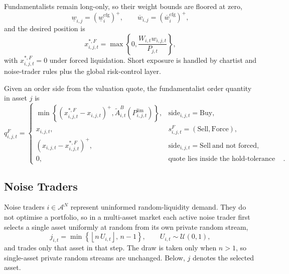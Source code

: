 \documentclass[12pt, a4paper]{article}
\newcommand{\pospart}[1]{\left(#1\right)^{+}}
\begin{document}
    Fundamentalists remain long-only, so their weight bounds are floored at zero,
    \[
        \underline w_{i,j}=\pospart{\underline w_i^{\text{cfg}}},
        \qquad
        \overline w_{i,j}=\pospart{\overline w_i^{\text{cfg}}},
    \]
    and the desired position is
    \[
        x_{i,j,t}^{\ast,F}=\max\left\{0,\frac{W_{i,t}w_{i,j,t}}{P_{j,t}}\right\},
    \]
    with \(x_{i,j,t}^{\ast,F}=0\) under forced liquidation. Short exposure is
    handled by chartist and noise-trader rules plus the global risk-control layer.

    Given an order side from the valuation quote, the fundamentalist order quantity
    in asset \(j\) is
    \[
        q_{i,j,t}^{F}=
        \begin{cases}
            \min\left\{\pospart{x_{i,j,t}^{\ast,F}-x_{i,j,t}},\tilde A_{i,t}^{B}(P_{i,j,t}^{\text{lim}})\right\},
            & \mathrm{side}_{i,j,t}=\mathrm{Buy},\\[1.2ex]
            x_{i,j,t},
            & s_{i,j,t}^{F}=(\mathrm{Sell},\mathrm{Force}),\\[1.2ex]
            \pospart{x_{i,j,t}-x_{i,j,t}^{\ast,F}},
            & \mathrm{side}_{i,j,t}=\mathrm{Sell}\ \text{and not forced},\\[1.2ex]
            0,
            & \text{quote lies inside the hold-tolerance band}.
        \end{cases}
    \]

    \subsection{Noise Traders}

    Noise traders \(i\in\mathcal{A}^N\) represent uninformed random-liquidity
    demand. They do not optimise a portfolio, so in a multi-asset market each
    active noise trader first selects a single asset uniformly at random from its
    own private random stream,
    \[
        j_{i,t}
        =
        \min\left\{\left\lfloor n\,U_{i,t}\right\rfloor,\,n-1\right\},
        \qquad
        U_{i,t}\sim\mathcal{U}(0,1),
    \]
    and trades only that asset in that step. The draw is taken only when
    \(n>1\), so single-asset private random streams are unchanged. Below,
    \(j\) denotes the selected asset.
\end{document}
